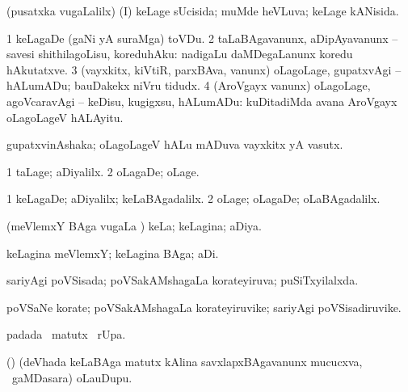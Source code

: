 \bentry
{} 
\gl{\gu}
\expl{}
\bmng
(pusatxka \mo vugaLalilx) (I) keLage sUcisida; muMde heVLuva; keLage kANisida. 
\emng
\eentry

\bentry
{} 
\gl{\sakirx}
\expl{}
\bmng
\bnum
\num{1} keLagaDe (gaNi yA suraMga) toVDu. 
\num{2} taLaBAgavanunx, aDipAyavanunx -- savesi shithilagoLisu, koreduhAku:  nadigaLu daMDegaLanunx koredu hAkutatxve. 
\num{3} (vayxkitx, kiVtiR, parxBAva, \mo vanunx) oLagoLage, gupatxvAgi -- hALumADu; bauDakekx niVru tidudx. 
\num{4} (AroVgayx \mo vanunx) oLagoLage, agoVcaravAgi -- keDisu, kugigxsu, hALumADu:  kuDitadiMda avana AroVgayx oLagoLageV hALAyitu. 
\enum
\emng
\eentry

\bentry
{} 
\gl{\nA}
\expl{}
\bmng
 gupatxvinAshaka; oLagoLageV hALu mADuva vayxkitx yA vasutx. 
\emng
\eentry

\bentry
{} 
\gl{\kirxvi}
\expl{}
\bmng
\bnum
\num{1} taLage; aDiyalilx. 
\num{2} oLagaDe; oLage. 
\enum
\emng
\eentry

\bentry
{} 
\gl{\upa}
\bmng
\bnum
\num{1} keLagaDe; aDiyalilx; keLaBAgadalilx. 
\num{2} oLage; oLagaDe; oLaBAgadalilx. 
\enum
\emng
\eentry

\bentry
{} 
\gl{\gu}
\expl{}
\bmng
 (meVlemxY BAga \mo vugaLa \vi) keLa; keLagina; aDiya. 
\emng
\eentry

\bentry
{} 
\gl{\nA}
\expl{}
\bmng
 keLagina meVlemxY; keLagina BAga; aDi. 
\emng
\eentry

\bentry
{} 
\gl{\gu}
\expl{}
\bmng
 sariyAgi poVSisada; poVSakAMshagaLa korateyiruva; puSiTxyilalxda. 
\emng
\eentry

\bentry
{} 
\gl{\nA}
\expl{}
\bmng
 poVSaNe korate; poVSakAMshagaLa korateyiruvike; sariyAgi poVSisadiruvike. 
\emng
\eentry

\bentry
{} 
\gl{\kirx}
\expl{}
\bmng
  padada \BU\ matutx \BUkaq\ rUpa. 
\emng
\eentry

\bentry
{} 
\gl{\nA}
\expl{}
\bmng
 (\bava) (deVhada keLaBAga matutx kAlina savxlapxBAgavanunx mucucxva, \kanmu\ gaMDasara) oLauDupu. 
\emng
\eentry


